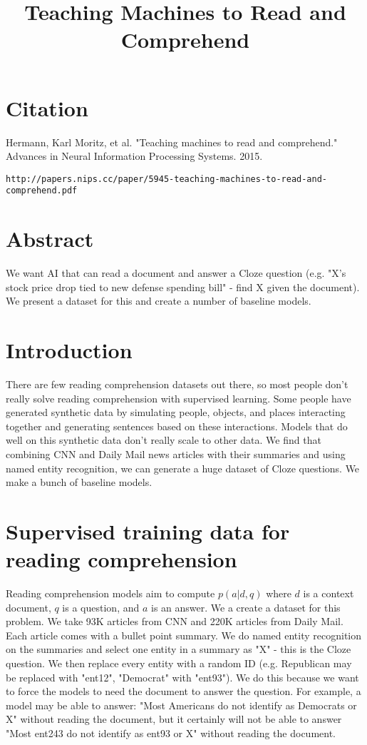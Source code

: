 \documentclass[a4paper]{article}
\title{Teaching Machines to Read and Comprehend}
\date{}
\begin{document}
\maketitle

\section{Citation}
Hermann, Karl Moritz, et al. "Teaching machines to read and comprehend." Advances in Neural Information Processing Systems. 2015.

\begin{verbatim}
http://papers.nips.cc/paper/5945-teaching-machines-to-read-and-comprehend.pdf
\end{verbatim}

\section{Abstract}
We want AI that can read a document and answer a Cloze question (e.g.
"X's stock price drop tied to new defense spending bill" - find X given
the document). We present a dataset for this and create a number of baseline
models.

\section{Introduction}
There are few reading comprehension datasets out there, so most people don't
really solve reading comprehension with supervised learning. Some people have
generated synthetic data by simulating people, objects, and places interacting
together and generating sentences based on these interactions. Models that do
 well on this synthetic data don't really
scale to other data. We find that combining CNN and Daily Mail news articles
with their summaries and using named entity recognition, we can generate
a huge dataset of Cloze questions. We make a bunch of baseline models.

\section{Supervised training data for reading comprehension}
Reading comprehension models aim to compute $p(a|d, q)$ where $d$ is a
context document, $q$ is a question, and $a$ is an answer. We a create a
dataset for this problem. We take 93K articles from CNN and 220K articles
from Daily Mail. Each article comes with a bullet point summary. We
do named entity recognition on the summaries and select one entity in a summary
as "X" - this is the Cloze question. We then replace every entity with a
random ID (e.g. Republican may be replaced with "ent12", "Democrat" with
"ent93"). We do this because we want to force the models to need the
document to answer the question. For example, a model may be able to answer:
"Most Americans do not identify as Democrats or X" without reading the
document, but it certainly will not be able to answer "Most ent243 do not
identify as ent93 or X" without reading the document.
\end{document}
